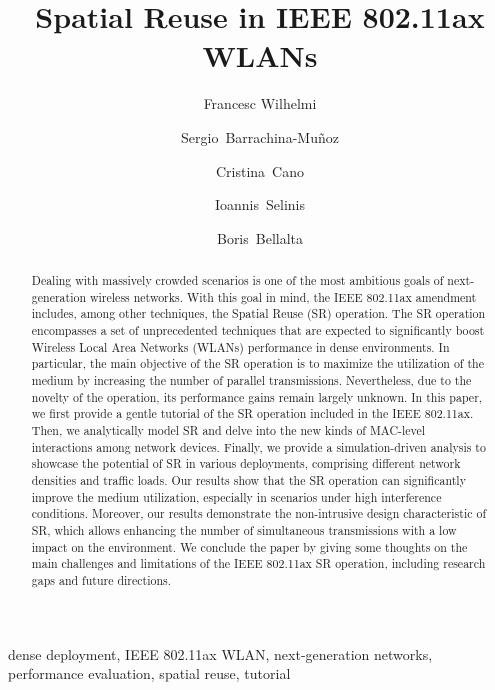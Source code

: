 \documentclass[preprint,12pt]{elsarticle}
\theoremstyle{plain}
\begin{document}
	
\begin{frontmatter}
	
\title{Spatial Reuse in IEEE 802.11ax WLANs}

\author[label1]{Francesc Wilhelmi } %
\author[label1]{Sergio~Barrachina-Mu\~noz}
\author[label2]{Cristina~Cano}
\author[label3]{Ioannis~Selinis}
\author[label1]{Boris~Bellalta}
\address[label1]{Wireless Networking Research Group (WN-UPF), 08002 Barcelona, Spain}
\address[label2]{Wireless Networks Research Group (WINE-UOC), 08860 Barcelona, Spain}
\address[label3]{Institute for Communications Systems (ICS-UoS), GU2 7XH Surrey, United Kingdom}

\begin{abstract}
Dealing with massively crowded scenarios is one of the most ambitious goals of next-generation wireless networks. With this goal in mind, the IEEE 802.11ax amendment includes, among other techniques, the Spatial Reuse (SR) operation. The SR operation encompasses a set of unprecedented techniques {that are expected to significantly boost Wireless Local Area Networks (WLANs) performance in dense environments}. In particular, the main objective of the SR operation is to maximize the utilization of the medium by increasing the number of parallel transmissions. Nevertheless, due to the novelty of the operation, its performance gains remain largely unknown. In this paper, we first provide a gentle tutorial of the SR operation included in the IEEE 802.11ax. Then, we analytically model SR and delve into the new kinds of MAC-level interactions among network devices. Finally, we provide a simulation-driven analysis to showcase the potential of SR in various deployments, comprising different network densities and traffic loads. Our results show that the SR operation can significantly improve the medium utilization, especially in scenarios under high interference conditions. Moreover, our results demonstrate the non-intrusive design characteristic of SR, which allows enhancing the number of simultaneous transmissions with a low impact on the environment. We conclude the paper by giving some thoughts on the main challenges and limitations of the IEEE 802.11ax SR operation, including research gaps and future directions.
\end{abstract}
	
\begin{keyword}
dense deployment, IEEE 802.11ax WLAN, next-generation networks, performance evaluation, spatial reuse, tutorial
\end{keyword}

\end{frontmatter}
		
\end{document}
